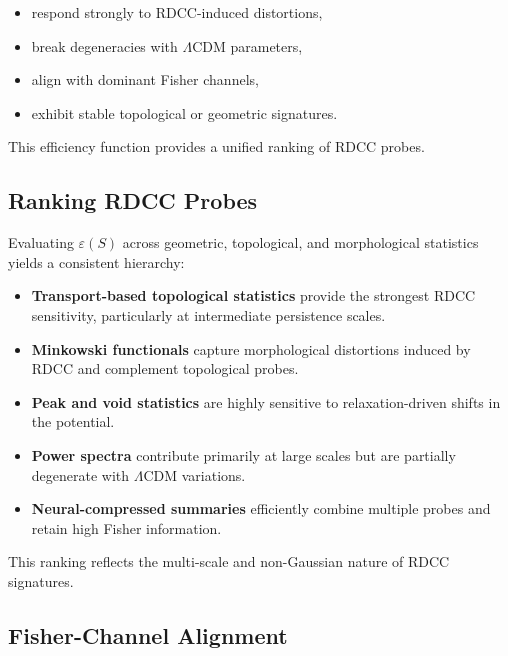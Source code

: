 \documentclass[11pt,a4paper]{article}
\begin{document}
\begin{itemize}
    \item respond strongly to RDCC-induced distortions,
    \item break degeneracies with $\Lambda$CDM parameters,
    \item align with dominant Fisher channels,
    \item exhibit stable topological or geometric signatures.
\end{itemize}

This efficiency function provides a unified ranking of RDCC probes.

\subsection{Ranking RDCC Probes}

Evaluating $\varepsilon(S)$ across geometric, topological, and morphological
statistics yields a consistent hierarchy:

\begin{itemize}
    \item \textbf{Transport-based topological statistics}  
    provide the strongest RDCC sensitivity, particularly at intermediate
    persistence scales.

    \item \textbf{Minkowski functionals}  
    capture morphological distortions induced by RDCC and complement topological
    probes.

    \item \textbf{Peak and void statistics}  
    are highly sensitive to relaxation-driven shifts in the potential.

    \item \textbf{Power spectra}  
    contribute primarily at large scales but are partially degenerate with
    $\Lambda$CDM variations.

    \item \textbf{Neural-compressed summaries}  
    efficiently combine multiple probes and retain high Fisher information.
\end{itemize}

This ranking reflects the multi-scale and non-Gaussian nature of RDCC
signatures.

\subsection{Fisher-Channel Alignment}
\end{document}
